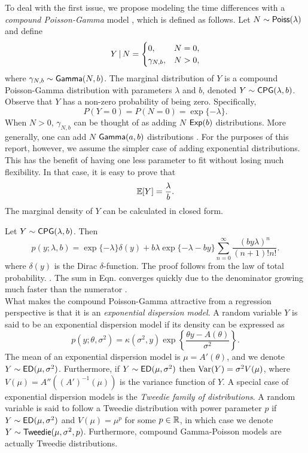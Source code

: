 \documentclass[aos,preprint]{imsart}
\begin{document}
To deal with the first issue, we propose modeling the time differences with a \textit{compound Poisson-Gamma} model \citep{tweedie1984, jorgensen1987}, which is defined as follows. Let $N \sim {\sf{Poiss}}(\lambda)$ and define
\[
  Y \given N = \begin{cases}
    0, & N = 0, \\
    \gamma_{N, b}, & N > 0,
  \end{cases}
\]
where $\gamma_{N, b} \sim {\sf{Gamma}}(N, b)$. The marginal distribution of $Y$ is a compound Poisson-Gamma distribution with parameters $\lambda$ and $b$, denoted $Y \sim {\sf{CPG}}(\lambda, b)$. Observe that $Y$ has a non-zero probability of being zero. Specifically,
\[
  P(Y = 0) = P(N = 0) = \exp \{ -\lambda \}.
\]
When $N > 0$, $\gamma_{N, b}$ can be thought of as adding $N$ \iid ${\sf{Exp}}(b)$ distributions. More generally, one can add $N$ \iid ${\sf{Gamma}}(a, b)$ distributions \citep[see][]{withers2011}. For the purposes of this report, however, we assume the simpler case of adding exponential distributions. This has the benefit of having one less parameter to fit without losing much flexibility. In that case, it is easy to prove that
\[
  \mathbb{E} [Y] = \frac{\lambda}{b}.
\]
The marginal density of $Y$ can be calculated in closed form.

\bnprop
  Let $Y \sim {\sf{CPG}}(\lambda, b)$. Then
  \[
    p(y; \lambda, b) = \exp\{ -\lambda \} \delta(y) + b \lambda \exp \{ -\lambda - by \} \sum_{n=0}^\infty \frac{(b y \lambda)^n}{(n+1)! n!}. \label{eq:cpg-pdf}
  \]
  where $\delta(y)$ is the Dirac $\delta$-function.
\enprop
The proof follows from the law of total probability. \cite[See][for example]{ozturk1981}. The sum in Eqn.  converges quickly due to the denominator growing much faster than the numerator \citep{withers2011}. \\


What makes the compound Poisson-Gamma attractive from a regression perspective is that it is an \textit{exponential dispersion model}. A random variable $Y$ is said to be an exponential dispersion model if its density can be expressed as
\[
  p(y; \theta, \sigma^2) = \kappa(\sigma^2, y) \exp \left\{ \frac{\theta y - A(\theta)}{\sigma^2} \right\}.
\]
The mean of an exponential dispersion model is $\mu = A'(\theta)$, and we denote $Y \sim {\sf{ED}}(\mu, \sigma^2)$. Furthermore, if $Y \sim {\sf{ED}}(\mu, \sigma^2)$ then $\operatorname{Var} (Y) = \sigma^2 V(\mu)$, where $V(\mu) = A''((A')^{-1}(\mu))$ is the variance function of $Y$. A special case of exponential dispersion models is the \textit{Tweedie family of distributions}. A random variable is said to follow a Tweedie distribution with power parameter $p$ if $Y \sim {\sf{ED}}(\mu, \sigma^2)$ and $V(\mu) = \mu^p$ for some $p \in \mathbb{R}$, in which case we denote $Y \sim {\sf{Tweedie}}(\mu, \sigma^2, p)$. Furthermore, compound Gamma-Poisson models are actually Tweedie distributions. \\
\end{document}
